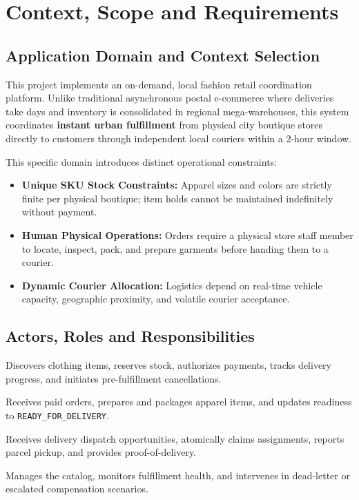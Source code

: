 \documentclass[11pt,a4paper]{article}
\begin{document}
\section{Context, Scope and Requirements}

\subsection{Application Domain and Context Selection}
This project implements an on-demand, local fashion retail coordination platform. Unlike traditional asynchronous postal e-commerce where deliveries take days and inventory is consolidated in regional mega-warehouses, this system coordinates \textbf{instant urban fulfillment} from physical city boutique stores directly to customers through independent local couriers within a 2-hour window.

This specific domain introduces distinct operational constraints:
\begin{itemize}[noitemsep]
    \item \textbf{Unique SKU Stock Constraints:} Apparel sizes and colors are strictly finite per physical boutique; item holds cannot be maintained indefinitely without payment.
    \item \textbf{Human Physical Operations:} Orders require a physical store staff member to locate, inspect, pack, and prepare garments before handing them to a courier.
    \item \textbf{Dynamic Courier Allocation:} Logistics depend on real-time vehicle capacity, geographic proximity, and volatile courier acceptance.
\end{itemize}

\subsection{Actors, Roles and Responsibilities}
\begin{description}[leftmargin=!,labelwidth=3.5cm]
    \item[Customer (Requester):] Discovers clothing items, reserves stock, authorizes payments, tracks delivery progress, and initiates pre-fulfillment cancellations.
    \item[Staff Member (Store):] Receives paid orders, prepares and packages apparel items, and updates readiness to \texttt{READY\_FOR\_DELIVERY}.
    \item[Courier (Logistics):] Receives delivery dispatch opportunities, atomically claims assignments, reports parcel pickup, and provides proof-of-delivery.
    \item[Store Admin:] Manages the catalog, monitors fulfillment health, and intervenes in dead-letter or escalated compensation scenarios.
\end{description}
\end{document}
